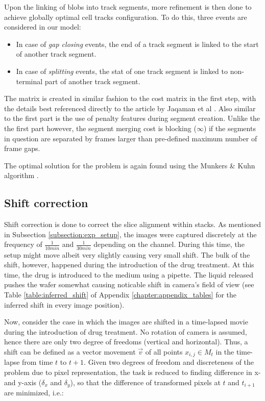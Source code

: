 \documentclass[pdftex,12pt,a4paper]{report}
\begin{document}

Upon the linking of blobs into track segments, more refinement is then done to achieve globally optimal cell tracks configuration. To do this, three events are considered in our model:

\begin{itemize}
\item In case of \textit{gap closing} events, the end of a track segment is linked to the start of another track segment.
\item In case of \textit{splitting} events, the stat of one track segment is linked to non-terminal part of another track segment.
\end{itemize}

The matrix is created in similar fashion to the cost matrix in the first step, with the details best referenced directly to the article by Jaqaman et al \cite{jaqaman2008robust}. Also similar to the first part is the use of penalty features during segment creation. Unlike the the first part however, the segment merging cost is blocking ($\infty$) if the segments in question are separated by frames larger than pre-defined maximum number of frame gaps.

The optimal solution for the problem is again found using the Munkers \& Kuhn algorithm \cite{munkres1957algorithms}.

\subsection{Shift correction}
\label{subsection:shift_correction}

Shift correction is done to correct the slice alignment within stacks. As mentioned in Subsection \ref{subsection:exp_setup}, the images were captured discretely at the frequency of $\frac{1}{10 min}$ and $\frac{1}{30 min}$ depending on the channel. During this time, the setup might move albeit very slightly causing very small shift. The bulk of the shift, however, happened during the introduction of the  drug treatment. At this time, the drug is introduced to the medium using a pipette. The liquid released pushes the wafer somewhat causing noticable shift in camera's field of view (see Table \ref{table:inferred_shift} of Appendix \ref{chapter:appendix_tables} for the inferred shift in every image position).

Now, consider the case in which the images are shifted in a time-lapsed movie during the introduction of drug treatment. No rotation of camera is assumed, hence there are only two degree of freedoms (vertical and horizontal). Thus, a shift can be defined as a vector movement $\vec{v}$ of all points $x_{i,j} \in M_t$ in the time-lapse from time $t$ to $t + 1$. Given two degrees of freedom and discreteness of the problem due to pixel representation, the task is reduced to finding difference in x- and y-axis ($\delta_x$ and $\delta_y$), so that the difference of transformed pixels at $t$ and $t_{i+1}$ are minimized, i.e.:
\end{document}
